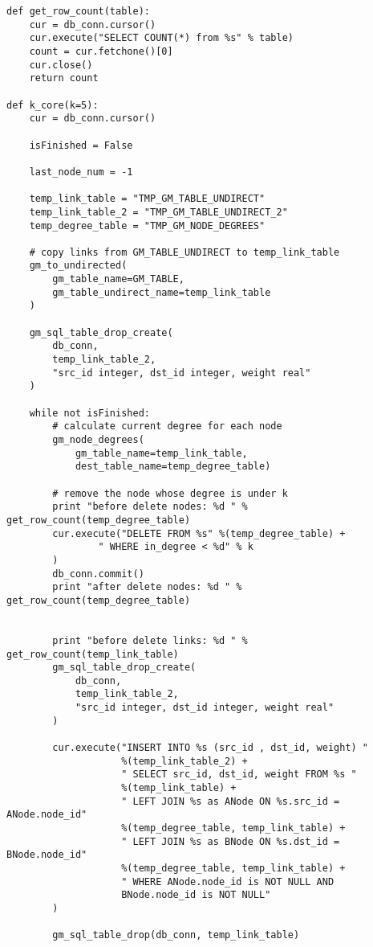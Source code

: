 \begin{lstlisting}
def get_row_count(table):
    cur = db_conn.cursor()
    cur.execute("SELECT COUNT(*) from %s" % table)
    count = cur.fetchone()[0]
    cur.close()
    return count

def k_core(k=5):
    cur = db_conn.cursor()

    isFinished = False

    last_node_num = -1

    temp_link_table = "TMP_GM_TABLE_UNDIRECT"
    temp_link_table_2 = "TMP_GM_TABLE_UNDIRECT_2"
    temp_degree_table = "TMP_GM_NODE_DEGREES"

    # copy links from GM_TABLE_UNDIRECT to temp_link_table
    gm_to_undirected(
        gm_table_name=GM_TABLE,
        gm_table_undirect_name=temp_link_table
    )

    gm_sql_table_drop_create(
        db_conn,
        temp_link_table_2,
        "src_id integer, dst_id integer, weight real"
    )

    while not isFinished:
        # calculate current degree for each node
        gm_node_degrees(
            gm_table_name=temp_link_table,
            dest_table_name=temp_degree_table)

        # remove the node whose degree is under k
        print "before delete nodes: %d " % get_row_count(temp_degree_table)
        cur.execute("DELETE FROM %s" %(temp_degree_table) +
                " WHERE in_degree < %d" % k
        )
        db_conn.commit()
        print "after delete nodes: %d " % get_row_count(temp_degree_table)


        print "before delete links: %d " % get_row_count(temp_link_table)
        gm_sql_table_drop_create(
            db_conn,
            temp_link_table_2,
            "src_id integer, dst_id integer, weight real"
        )

        cur.execute("INSERT INTO %s (src_id , dst_id, weight) " 
        			%(temp_link_table_2) +
                    " SELECT src_id, dst_id, weight FROM %s " 
                    %(temp_link_table) +
                    " LEFT JOIN %s as ANode ON %s.src_id = ANode.node_id" 
                    %(temp_degree_table, temp_link_table) +
                    " LEFT JOIN %s as BNode ON %s.dst_id = BNode.node_id" 
                    %(temp_degree_table, temp_link_table) +
                    " WHERE ANode.node_id is NOT NULL AND 
                    BNode.node_id is NOT NULL"
        )

        gm_sql_table_drop(db_conn, temp_link_table)


\end{lstlisting}
